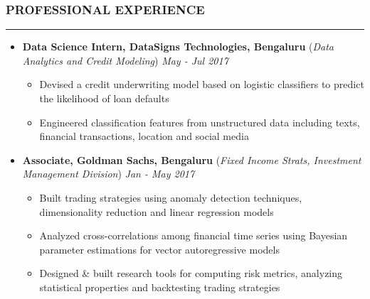 \documentclass[10pt,a4paper,English]{article}
\newcommand\roottitle[1]{\vspace{-4mm}\subsubsection*{\uppercase{#1}}\vspace{-0.3em}\nopagebreak[4]\hrule\vspace{4mm}}
\newcommand\itemyear[1]{\hfill \emph{\color{itemyear} #1}}
\newcommand\itemenv{\setlength\itemsep{0.5pt} \addtolength{\itemindent}{-5mm}\vspace{-1.5mm}}
\begin{document}
\vspace{1.5mm}

\roottitle{Professional Experience}
\begin{itemize} \itemenv

    \item \textbf{Data Science Intern, DataSigns Technologies, Bengaluru } \hfill({\emph{Data Analytics and Credit Modeling}}) \itemyear{May - Jul 2017}
        \begin{itemize} \itemenv
            \item Devised a credit underwriting model based on logistic classifiers to predict the likelihood of loan defaults
            \item Engineered classification features from unstructured data including texts, financial transactions, location and social media
        \end{itemize}

    \item \textbf{Associate, Goldman Sachs, Bengaluru} \hfill (\emph{Fixed Income Strats, Investment Management Division}) \itemyear{Jan - May 2017}
        \begin{itemize} \itemenv
            \item Built trading strategies using anomaly detection techniques, dimensionality reduction and linear regression models
             \item Analyzed cross-correlations among financial time series using Bayesian parameter estimations for vector autoregressive models
            \item Designed \& built research tools for computing risk metrics, analyzing statistical properties and backtesting trading strategies
        \end{itemize}


\end{itemize}
\end{document}
